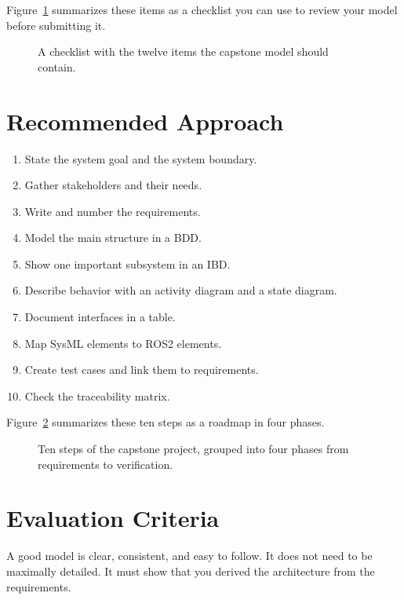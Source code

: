 Figure~\ref{fig:kap21-checkliste-abschlussmodell} summarizes these items as a checklist you can use to review your model before submitting it.

\begin{figure}[H]
  \centering
  \caption{A checklist with the twelve items the capstone model should contain.}
  \label{fig:kap21-checkliste-abschlussmodell}
\end{figure}

\section{Recommended Approach}
\begin{enumerate}
    \item State the system goal and the system boundary.
    \item Gather stakeholders and their needs.
    \item Write and number the requirements.
    \item Model the main structure in a BDD.
    \item Show one important subsystem in an IBD.
    \item Describe behavior with an activity diagram and a state diagram.
    \item Document interfaces in a table.
    \item Map SysML elements to ROS2 elements.
    \item Create test cases and link them to requirements.
    \item Check the traceability matrix.
\end{enumerate}

Figure~\ref{fig:kap21-projektfahrplan} summarizes these ten steps as a roadmap in four phases.

\begin{figure}[H]
  \centering
  \caption{Ten steps of the capstone project, grouped into four phases from requirements to verification.}
  \label{fig:kap21-projektfahrplan}
\end{figure}

\section{Evaluation Criteria}
A good model is clear, consistent, and easy to follow. It does not need to be maximally detailed. It must show that you derived the architecture from the requirements.

